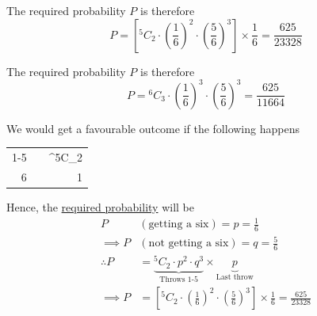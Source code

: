 \documentclass[14pt,fleqn]{extarticle}
\begin{document}
\newcard 

The required probability $P$ is therefore 
\[ P = \left[^5C_2\cdot\left(\frac{1}{6} \right)^2\cdot\left(\frac{5}{6}\right)^3\right]\times\frac{1}{6}=\frac{625}{23328} \]

\newcard

The required probability $P$ is therefore 
\[ P = {^6C_3}\cdot\left(\frac{1}{6} \right)^3\cdot\left(\frac{5}{6}\right)^3=\frac{625}{11664} \]

\newcard

We would get a favourable outcome if the following happens 

%
\begin{center}
\begin{tabular}{NNN}
\toprule
{} &  &  \\
-5 &  & ^5C_2 \\
 &  & 1 \\
\bottomrule 
\end{tabular}
\end{center} 

Hence, the \underline{required probability} will be 
%
\begin{align}
P &\left(\text{getting a six} \right) = p = \frac{1}{6}\\
\implies P &\left(\text{not getting a six} \right) = q = \frac{5}{6} \\
\therefore P &= \underbrace{^5C_2\cdot p^2\cdot q^3}_{\text{Throws 1-5}}\times\underbrace{p}_{\text{Last throw}} \\
\implies P &= \left[^5C_2\cdot\left(\frac{1}{6} \right)^2\cdot\left(\frac{5}{6}\right)^3\right]\times\frac{1}{6} = \frac{625}{23328}
\end{align}
\end{document}
